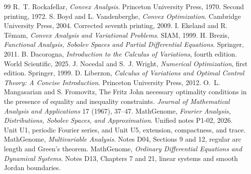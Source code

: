 \documentclass[11pt,oneside,openany]{book}
\theoremstyle{plain}
\theoremstyle{definition}
\theoremstyle{remark}
\begin{document}
\backmatter
\begin{thebibliography}{99}
R.~T. Rockafellar, \emph{Convex Analysis}. Princeton University Press,
1970. Second printing, 1972.
S. Boyd and L. Vandenberghe, \emph{Convex Optimization}.
Cambridge University Press, 2004. Corrected seventh printing, 2009.
I. Ekeland and R. T\'emam, \emph{Convex Analysis and Variational
Problems}. SIAM, 1999.
H. Brezis, \emph{Functional Analysis, Sobolev Spaces and Partial
Differential Equations}. Springer, 2011.
B. Dacorogna, \emph{Introduction to the Calculus of Variations},
fourth edition. World Scientific, 2025.
J. Nocedal and S.~J. Wright, \emph{Numerical Optimization},
first edition. Springer, 1999.
D. Liberzon, \emph{Calculus of Variations and Optimal Control Theory:
A Concise Introduction}. Princeton University Press, 2012.
O.~L. Mangasarian and S. Fromovitz, The Fritz John necessary optimality
conditions in the presence of equality and inequality constraints.
\emph{Journal of Mathematical Analysis and Applications}
17 (1967), 37--47.
MathGenome, \emph{Fourier Analysis, Distributions, Sobolev Spaces, and
Approximation}. Unified notes P1-02, 2026. Unit U1, periodic Fourier
series, and Unit U5, extension, compactness, and trace.
MathGenome, \emph{Multivariable Analysis}. Notes D04, Sections 9 and 12,
regular arc length and Green's theorem.
MathGenome, \emph{Ordinary Differential Equations and Dynamical Systems}.
Notes D13, Chapters 7 and 21, linear systems and smooth Jordan boundaries.
\end{thebibliography}
\end{document}
